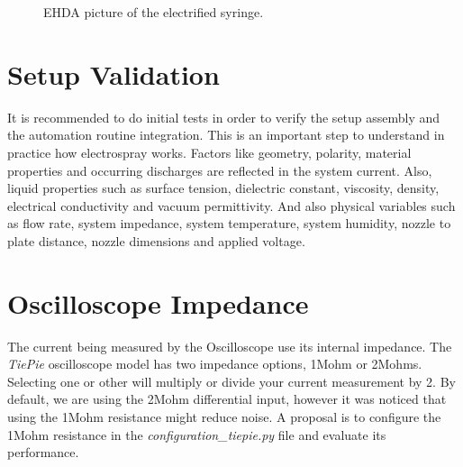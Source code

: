 \begin{figure}[H]
    \centering
    \label{fig:nozzleElectr}
    \caption{EHDA picture of the electrified syringe.}
\end{figure}


\section{Setup Validation}
\label{sec:setup_validation}


It is recommended to do initial tests in order to verify the setup assembly and the automation routine integration. 
This is an important step to understand in practice how electrospray works.
Factors like geometry, polarity, material properties and occurring discharges are reflected in the system current.
Also, liquid properties such as surface tension, dielectric constant, viscosity, density, electrical conductivity and vacuum permittivity. 
And also physical variables such as flow rate, system impedance, system temperature, system humidity, nozzle to plate distance, nozzle dimensions and applied voltage.


\section{Oscilloscope Impedance}
\label{sec:osc_impedance}

The current being measured by the Oscilloscope use its internal impedance. 
The \emph{TiePie} oscilloscope model has two impedance options, 1Mohm or 2Mohms. 
Selecting one or other will multiply or divide your current measurement by 2. 
By default, we are using the 2Mohm differential input, however it was noticed that using the 1Mohm resistance might reduce noise. 
A proposal is to configure the 1Mohm resistance in the \emph{configuration\_tiepie.py} file and evaluate its performance.